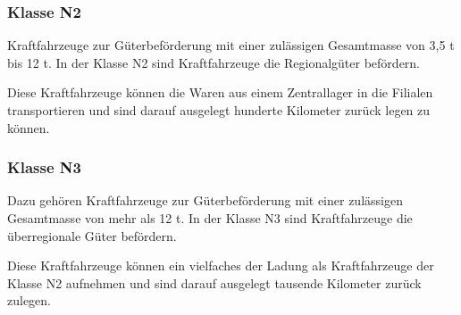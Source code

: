\subsubsection{Klasse N2}
Kraftfahrzeuge zur Güterbeförderung mit einer zulässigen Gesamtmasse von 3,5 \ac{t} bis 12 \ac{t}.
In der Klasse N2 sind Kraftfahrzeuge die Regionalgüter befördern.

Diese Kraftfahrzeuge können die Waren aus einem Zentrallager in die Filialen transportieren
und sind darauf ausgelegt hunderte Kilometer zurück legen zu können.

\newpage

\subsubsection{Klasse N3}
Dazu gehören Kraftfahrzeuge zur Güterbeförderung mit einer zulässigen Gesamtmasse von mehr als 12 \ac{t}.
In der Klasse N3 sind Kraftfahrzeuge die überregionale Güter befördern.

Diese Kraftfahrzeuge können ein vielfaches der Ladung als Kraftfahrzeuge der Klasse N2 aufnehmen
und sind darauf ausgelegt tausende Kilometer zurück zulegen.

